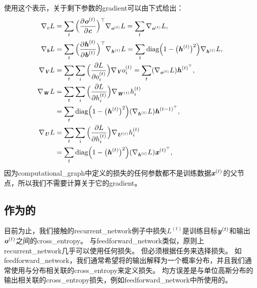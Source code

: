 使用这个表示，关于剩下参数的\gls{gradient}可以由下式给出：
\begin{align}
 \nabla_{\boldsymbol{\mathit{c}}} L &=  \sum_t \Big( \frac{\partial \boldsymbol{\mathit{o}}^{(t)}}{\partial \boldsymbol{\mathit{c}}} \Big)^\top \nabla_{\boldsymbol{\mathit{o}}^{(t)}} L 
 = \sum_t \nabla_{\boldsymbol{\mathit{o}}^{(t)}} L ,\\
 \nabla_{\boldsymbol{\mathit{b}}} L &= \sum_t \Big( \frac{\partial \boldsymbol{\mathit{h}}^{(t)}}{\partial \boldsymbol{\mathit{b}}^{(t)}} \Big)^\top \nabla_{\boldsymbol{\mathit{h}}^{(t)}} L 
 = \sum_t \text{diag} \Big( 1 - \big( \boldsymbol{\mathit{h}}^{(t)} \big)^2 \Big)  \nabla_{\boldsymbol{\mathit{h}}^{(t)}} L  ,\\
 \nabla_{\boldsymbol{\mathit{V}}} L &= \sum_t \sum_i \Big( \frac{\partial L} {\partial o_i^{(t)}}\Big) \nabla_{\boldsymbol{\mathit{V}}} o_i^{(t)} 
 = \sum_t (\nabla_{\boldsymbol{\mathit{o}}^{(t)}} L) \boldsymbol{\mathit{h}}^{(t)^\top},\\
 \nabla_{\boldsymbol{\mathit{W}}} L &= \sum_t \sum_i \Big( \frac{\partial L} {\partial h_i^{(t)}}\Big) 
 \nabla_{\boldsymbol{\mathit{W}}^{(t)}} h_i^{(t)} \\
&= \sum_t \text{diag} \Big( 1 - \big( \boldsymbol{\mathit{h}}^{(t)} \big)^2 \Big) ( \nabla_{\boldsymbol{\mathit{h}}^{(t)}} L) \boldsymbol{\mathit{h}}^{(t-1)^\top} ,\\
 \nabla_{\boldsymbol{\mathit{U}}} L &= \sum_t \sum_i \Big( \frac{\partial L} {\partial h_i^{(t)}}\Big) 
 \nabla_{\boldsymbol{\mathit{U}}^{(t)}} h_i^{(t)} \\
&= \sum_t \text{diag} \Big( 1 - \big( \boldsymbol{\mathit{h}}^{(t)} \big)^2 \Big) ( \nabla_{\boldsymbol{\mathit{h}}^{(t)}} L) \boldsymbol{\mathit{x}}^{(t)^\top} ,
\end{align}
因为\gls{computational_graph}中定义的损失的任何参数都不是训练数据$\boldsymbol{\mathit{x}}^{(t)}$的父节点，所以我们不需要计算关于它的\gls{gradient}。


\subsection{作为的}
\label{sec:recurrent_networks_as_directed_graphical_models}
目前为止，我们接触的\gls{recurrent_network}例子中损失$L^{(t)}$是训练目标$\boldsymbol{\mathit{y}}^{(t)}$和输出$\boldsymbol{\mathit{o}}^{(t)}$之间的\gls{cross_entropy}。
与\gls{feedforward_network}类似，原则上\gls{recurrent_network}几乎可以使用任何损失。
但必须根据任务来选择损失。
如\gls{feedforward_network}，我们通常希望将的输出解释为一个概率分布，并且我们通常使用与分布相关联的\gls{cross_entropy}来定义损失。
均方误差是与单位高斯分布的输出相关联的\gls{cross_entropy}损失，例如\gls{feedforward_network}中所使用的。

